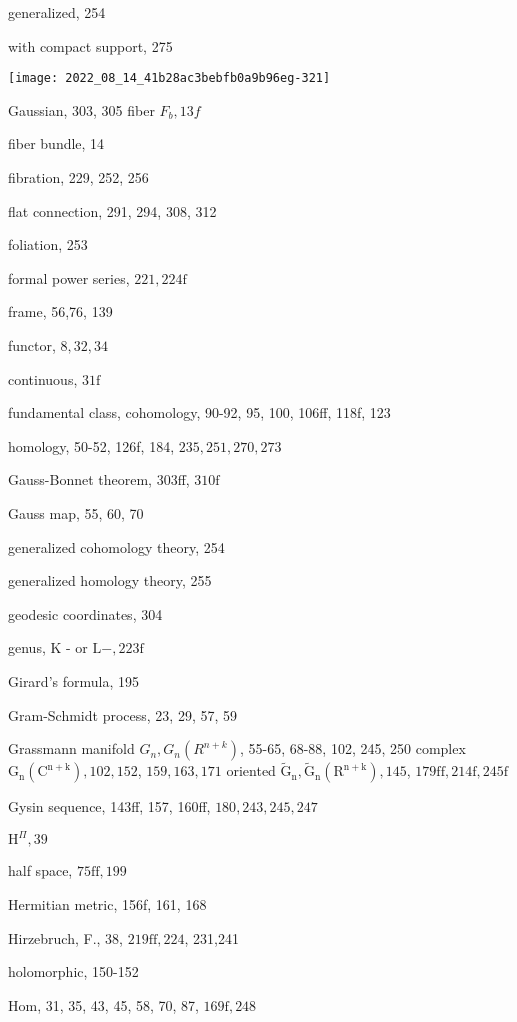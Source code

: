 \documentclass[10pt]{article}
\begin{document}
generalized, 254

with compact support, 275

\texttt{[image: 2022\_08\_14\_41b28ac3bebfb0a9b96eg-321]}

Gaussian, 303, 305 fiber $F_{b}, 13 f$

fiber bundle, 14

fibration, 229, 252, 256

flat connection, 291, 294, 308, 312

foliation, 253

formal power series, $221,224 \mathrm{f}$

frame, 56,76, 139

functor, $8,32,34$

continuous, $31 \mathrm{f}$

fundamental class, cohomology, 90-92, 95, 100, 106ff, 118f, 123

homology, 50-52, 126f, 184, $235,251,270,273$

Gauss-Bonnet theorem, 303ff, $310 \mathrm{f}$

Gauss map, 55, 60, 70

generalized cohomology theory, 254

generalized homology theory, 255

geodesic coordinates, 304

genus, $\mathrm{K}$ - or $\mathrm{L}-, 223 \mathrm{f}$

Girard's formula, 195

Gram-Schmidt process, 23, 29, 57, 59

Grassmann manifold $G_{n}, G_{n}\left(R^{n+k}\right)$, 55-65, 68-88, 102, 245, 250 complex $\mathrm{G}_{\mathrm{n}}\left(\mathrm{C}^{\mathrm{n}+\mathrm{k}}\right), 102,152$, $159,163,171$ oriented $\widetilde{\mathrm{G}}_{\mathrm{n}}, \widetilde{\mathrm{G}}_{\mathrm{n}}\left(\mathrm{R}^{\mathrm{n}+\mathrm{k}}\right), 145$, $179 \mathrm{ff}, 214 \mathrm{f}, 245 \mathrm{f}$

Gysin sequence, 143ff, 157, 160ff, $180,243,245,247$

$\mathrm{H}^{\Pi}, 39$

half space, $75 \mathrm{ff}, 199$

Hermitian metric, 156f, 161, 168

Hirzebruch, F., 38, $219 \mathrm{ff}, 224$, 231,241

holomorphic, 150-152

Hom, 31, 35, 43, 45, 58, 70, 87, $169 \mathrm{f}, 248$
\end{document}
